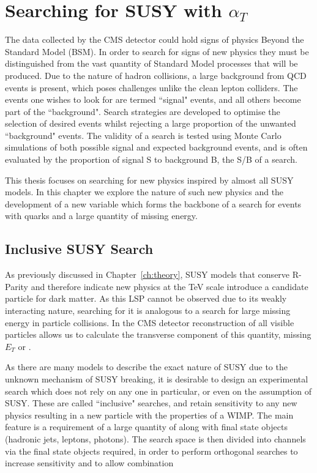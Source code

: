 \chapter{Searching for SUSY with $\alpha_{T}$}
\label{ch:at}

The data collected by the CMS detector could hold signs of physics Beyond the Standard Model (BSM). In order to search for signs of new physics they must be distinguished from the vast quantity of Standard Model processes that will be produced. Due to the nature of hadron collisions, a large background from QCD events is present, which poses challenges unlike the clean lepton colliders. The events one wishes to look for are termed ``signal" events, and all others become part of the ``background". Search strategies are developed to optimise the selection of desired events whilst rejecting a large proportion of the unwanted ``background" events. The validity of a search is tested using Monte Carlo simulations of both possible signal and expected background events, and is often evaluated by the proportion of signal S to background B, the S/B of a search. 

This thesis focuses on searching for new physics inspired by almost all SUSY models. In this chapter we explore the nature of such new physics and the development of a new variable \alt which forms the backbone of a search for events with quarks and a large quantity of missing energy. 

\section{Inclusive SUSY Search}

As previously discussed in Chapter~\ref{ch:theory}, SUSY models that conserve R-Parity and therefore indicate new physics at the TeV scale introduce a candidate particle for dark matter. As this LSP cannot be observed due to its weakly interacting nature, searching for it is analogous to a search for large missing energy in particle collisions. In the CMS detector reconstruction of all visible particles allows us to calculate the transverse component of this quantity, missing $E_{T}$ or \met. 

As there are many models to describe the exact nature of SUSY due to the unknown mechanism of SUSY breaking, it is desirable to design an experimental search which does not rely on any one in particular, or even on the assumption of SUSY. These are called ``inclusive" searches, and retain sensitivity to any new physics resulting in a new particle with the properties of a WIMP. The main feature is a requirement of a large quantity of \met along with final state objects (hadronic jets, leptons, photons). The search space is then divided into channels via the final state objects required, in order to perform orthogonal searches to increase sensitivity and to allow combination 

